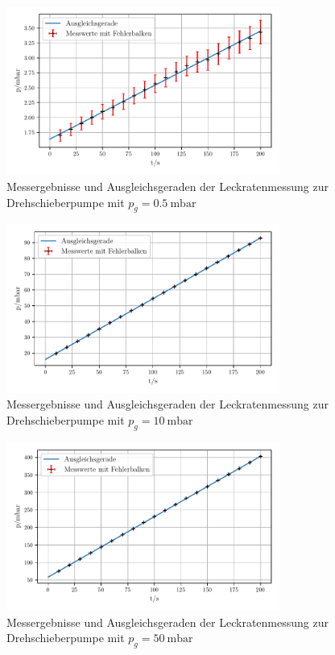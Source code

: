     \begin{figure}
        \centering
        \includegraphics[width=0.8\textwidth]{abb/dreh_leck0.5.pdf}
        \caption{Messergebnisse und Ausgleichsgeraden der Leckratenmessung zur Drehschieberpumpe mit $p_g = \qty{0.5}{\milli\bar}$}
        \label{fig:drehLeck05}
    \end{figure}

    \begin{figure}
        \centering
        \includegraphics[width=0.8\textwidth]{abb/dreh_leck10.pdf}
        \caption{Messergebnisse und Ausgleichsgeraden der Leckratenmessung zur Drehschieberpumpe mit $p_g = \qty{10}{\milli\bar}$}
        \label{fig:drehLeck10}
    \end{figure}

    \begin{figure}
        \centering
        \includegraphics[width=0.8\textwidth]{abb/dreh_leck50.pdf}
        \caption{Messergebnisse und Ausgleichsgeraden der Leckratenmessung zur Drehschieberpumpe mit $p_g = \qty{50}{\milli\bar}$}
        \label{fig:drehLeck50}
    \end{figure}

